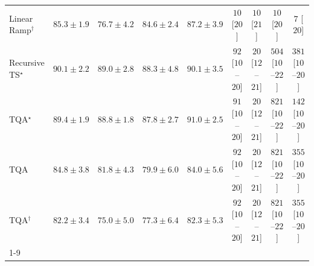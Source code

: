 \begin{tabular}{l|cccc|cccc|}
Linear Ramp$^\dagger$ & {\cellcolor[HTML]{05659F}} \color[HTML]{F1F1F1} $85.3\pm 1.9$ & {\cellcolor[HTML]{3F93C2}} \color[HTML]{F1F1F1} $76.7\pm 4.2$ & {\cellcolor[HTML]{0569A4}} \color[HTML]{F1F1F1} $84.6\pm 2.4$ & {\cellcolor[HTML]{045E93}} \color[HTML]{F1F1F1} $87.2\pm 3.9$ & {\cellcolor[HTML]{FFF7F3}} \color[HTML]{000000} $10$ [$20$] & {\cellcolor[HTML]{FFF7F3}} \color[HTML]{000000} $10$ [$21$] & {\cellcolor[HTML]{FFF7F3}} \color[HTML]{000000} $10$ [$20$] & {\cellcolor[HTML]{FFF7F3}} \color[HTML]{000000} $7$ [$20$] \\
Recursive TS$^\star$ & {\cellcolor[HTML]{034C78}} \color[HTML]{F1F1F1} $90.1\pm 2.2$ & {\cellcolor[HTML]{045483}} \color[HTML]{F1F1F1} $89.0\pm 2.8$ & {\cellcolor[HTML]{04588A}} \color[HTML]{F1F1F1} $88.3\pm 4.8$ & {\cellcolor[HTML]{034C78}} \color[HTML]{F1F1F1} $90.1\pm 3.5$ & {\cellcolor[HTML]{FDE4E1}} \color[HTML]{000000} $92$ [$10$--$20$] & {\cellcolor[HTML]{FFF4F0}} \color[HTML]{000000} $20$ [$12$--$21$] & {\cellcolor[HTML]{E13B98}} \color[HTML]{F1F1F1} $504$ [$10$--$22$] & {\cellcolor[HTML]{F87CA8}} \color[HTML]{F1F1F1} $381$ [$10$--$20$] \\
TQA$^\star$ & {\cellcolor[HTML]{045280}} \color[HTML]{F1F1F1} $89.4\pm 1.9$ & {\cellcolor[HTML]{045585}} \color[HTML]{F1F1F1} $88.8\pm 1.8$ & {\cellcolor[HTML]{045B8E}} \color[HTML]{F1F1F1} $87.8\pm 2.7$ & {\cellcolor[HTML]{03476F}} \color[HTML]{F1F1F1} $91.0\pm 2.5$ & {\cellcolor[HTML]{FDE4E1}} \color[HTML]{000000} $91$ [$10$--$20$] & {\cellcolor[HTML]{FFF4F0}} \color[HTML]{000000} $20$ [$12$--$21$] & {\cellcolor[HTML]{4B006A}} \color[HTML]{F1F1F1} $821$ [$10$--$22$] & {\cellcolor[HTML]{FDD7D4}} \color[HTML]{000000} $142$ [$10$--$20$] \\
TQA & {\cellcolor[HTML]{0567A2}} \color[HTML]{F1F1F1} $84.8\pm 3.8$ & {\cellcolor[HTML]{0F76B3}} \color[HTML]{F1F1F1} $81.8\pm 4.3$ & {\cellcolor[HTML]{2081B9}} \color[HTML]{F1F1F1} $79.9\pm 6.0$ & {\cellcolor[HTML]{056BA7}} \color[HTML]{F1F1F1} $84.0\pm 5.6$ & {\cellcolor[HTML]{FDE4E1}} \color[HTML]{000000} $92$ [$10$--$20$] & {\cellcolor[HTML]{FFF4F0}} \color[HTML]{000000} $20$ [$12$--$21$] & {\cellcolor[HTML]{4B006A}} \color[HTML]{F1F1F1} $821$ [$10$--$22$] & {\cellcolor[HTML]{F98AAD}} \color[HTML]{000000} $355$ [$10$--$20$] \\
TQA$^\dagger$ & {\cellcolor[HTML]{0A73B2}} \color[HTML]{F1F1F1} $82.2\pm 3.4$ & {\cellcolor[HTML]{549CC7}} \color[HTML]{F1F1F1} $75.0\pm 5.0$ & {\cellcolor[HTML]{3991C1}} \color[HTML]{F1F1F1} $77.3\pm 6.4$ & {\cellcolor[HTML]{0A73B2}} \color[HTML]{F1F1F1} $82.3\pm 5.3$ & {\cellcolor[HTML]{FDE4E1}} \color[HTML]{000000} $92$ [$10$--$20$] & {\cellcolor[HTML]{FFF4F0}} \color[HTML]{000000} $20$ [$12$--$21$] & {\cellcolor[HTML]{4B006A}} \color[HTML]{F1F1F1} $821$ [$10$--$22$] & {\cellcolor[HTML]{F98AAD}} \color[HTML]{000000} $355$ [$10$--$20$] \\
\cline{1-9}
\bottomrule
\end{tabular}
